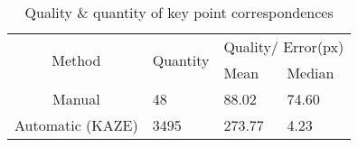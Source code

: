 \begin{table}[]
   \begin{tabular}{c|l|ll}
   \multirow{2}{*}{Method} & \multirow{2}{*}{Quantity} & \multicolumn{2}{c}{Quality/ Error(px)}        \\ \cline{3-4} 
                           &                           & \multicolumn{1}{l|}{Mean} & Median \\ \hline
   Manual                  & 48                       & \multicolumn{1}{l|}{88.02}  & 74.60    \\
   Automatic (KAZE)        & 3495                       & \multicolumn{1}{l|}{273.77}  & 4.23   
\end{tabular}
\caption{Quality \& quantity of key point correspondences}
\label{correspondence:table}
\end{table}